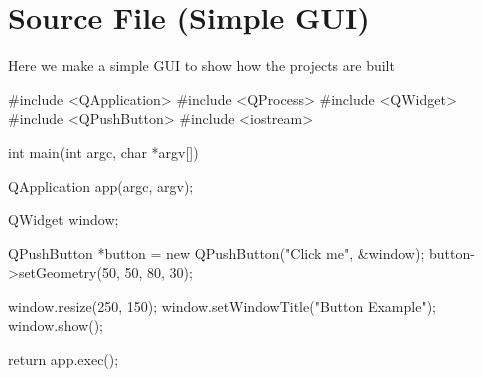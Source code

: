 \documentclass{report}
\begin{document}
    \section*{Source File (Simple GUI)}
    \bigbreak \noindent 
    Here we make a simple GUI to show how the projects are built
    \bigbreak \noindent 
    \begin{cppcode}
#include <QApplication>
#include <QProcess>
#include <QWidget>
#include <QPushButton>
#include <iostream>

int main(int argc, char *argv[]) {
    QApplication app(argc, argv);

    QWidget window;

    QPushButton *button = new QPushButton("Click me", &window);
    button->setGeometry(50, 50, 80, 30);

    window.resize(250, 150);
    window.setWindowTitle("Button Example");
    window.show();

    return app.exec();
}
    \end{cppcode}

    \pagebreak 
\end{document}
